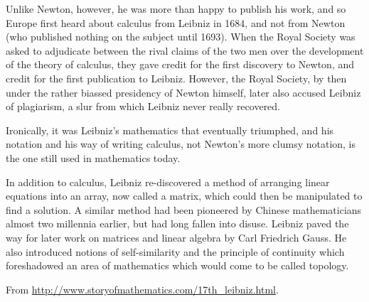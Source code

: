 Unlike Newton, however, he was more than happy to publish his work, and so Europe first heard about calculus from Leibniz in 1684, and not from Newton (who published nothing on the subject until 1693). When the Royal Society was asked to adjudicate between the rival claims of the two men over the development of the theory of calculus, they gave credit for the first discovery to Newton, and credit for the first publication to Leibniz. However, the Royal Society, by then under the rather biassed presidency of Newton himself, later also accused Leibniz of plagiarism, a slur from which Leibniz never really recovered.

Ironically, it was Leibniz’s mathematics that eventually triumphed, and his notation and his way of writing calculus, not Newton’s more clumsy notation, is the one still used in mathematics today.

In addition to calculus, Leibniz re-discovered a method of arranging linear equations into an array, now called a matrix, which could then be manipulated to find a solution. A similar method had been pioneered by Chinese mathematicians almost two millennia earlier, but had long fallen into disuse. Leibniz paved the way for later work on matrices and linear algebra by Carl Friedrich Gauss. He also introduced notions of self-similarity and the principle of continuity which foreshadowed an area of mathematics which would come to be called topology.

\begin{flushright}
  From \url{http://www.storyofmathematics.com/17th_leibniz.html}.
\end{flushright}

\clearpage
